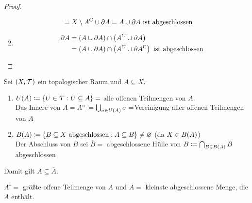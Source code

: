 \begin{satz}
\begin{proof}
\begin{enumerate}[label=(\roman*)]
\begin{align*}
                &= X\setminus A^{\mathrm{C}} \cup \partial A = A\cup \partial A \text{ ist abgeschlossen }
            \end{align*}
            \item
            \begin{align*}
                \partial A &= \left(A\cup \partial A\right) \cap \left(A^C \cup \partial A\right)\\
                &= \left(A \cup \partial A\right) \cap \left(A^C \cup \partial A^{\mathrm{C}}\right) \text{ ist abgeschlossen}
            \end{align*}
        \end{enumerate}
    \end{proof}
\end{satz}

\begin{definition}
    Sei $\pair{X, \Tau}$ ein topologischer Raum und $A\subseteq X$.
    \begin{enumerate}[label=(\roman*)]
        \item $U\of{A} \coloneqq \set{U\in\Tau: U\subseteq A}= $ alle offenen Teilmengen von $A$.\\
        Das Innere von $A = A^{\circ} \coloneqq \bigcup_{\sigma\in U\of{A}} \sigma= $Vereinigung aller offenen Teilmengen von $A$
        \item $B\of{A} \coloneqq \set{B\subseteq X \text{ abgeschlossen}: A \subseteq B} \neq \emptyset$ (da $X\in B\of{A}$)\\
        Der Abschluss von $B$ sei $\overline{B} =$ abgeschlossene Hülle von $B \coloneqq \bigcap_{B\in B\of{A}} B$ abgeschlossen
    \end{enumerate}
    Damit gilt $A \subseteq \overline{A}$.
\end{definition}

\begin{bemerkung}
    $A^{\circ} =$ größte offene Teilmenge von $A$ und $\overline{A} = $ kleinste abgeschlossene Menge, die $A$ enthält.
\end{bemerkung}

